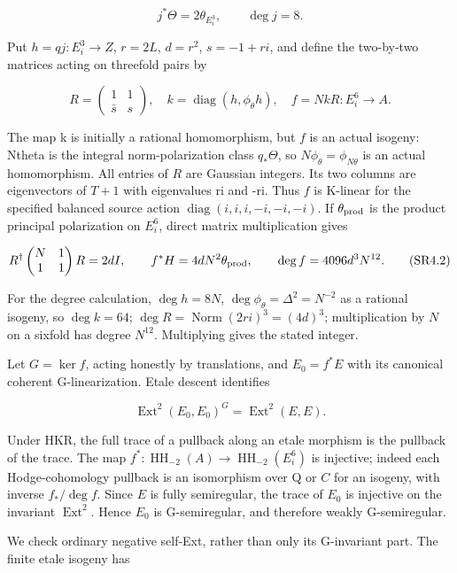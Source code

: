 \[
j^*\Theta=2\theta_{E_i^3},\qquad\deg j=8.
\]

Put \(h=qj:E_i^3\to Z\), \(r=2L\), \(d=r^2\), \(s=-1+ri\), and define the two-by-two matrices acting on threefold pairs by

\[
R=\begin{pmatrix}1&1\\\bar s&s\end{pmatrix},\quad k=\operatorname{diag}(h,\phi_\theta h),\quad f=NkR:E_i^6\longrightarrow A.\tag{SR4.1}
\]

The map k is initially a rational homomorphism, but \(f\) is an actual isogeny: Ntheta is the integral norm-polarization class \(q_*\Theta\), so \(N\phi_\theta=\phi_{N\theta}\) is an actual homomorphism. All entries of \(R\) are Gaussian integers. Its two columns are eigenvectors of \(T+1\) with eigenvalues ri and -ri. Thus \(f\) is K-linear for the specified balanced source action \(\operatorname{diag}(i,i,i,-i,-i,-i)\). If \(\theta_{\rm prod}\) is the product principal polarization on \(E_i^6\), direct matrix multiplication gives

\[
R^\dagger\begin{pmatrix}N&1\\1&1\end{pmatrix}R=2dI,\qquad f^*H=4dN^2\theta_{\rm prod},\qquad\deg f=4096d^3N^{12}.\tag{SR4.2}
\]

For the degree calculation, \(\deg h=8N\), \(\deg\phi_\theta=\Delta^2=N^{-2}\) as a rational isogeny, so \(\deg k=64\); \(\deg R=\operatorname{Norm}(2ri)^3=(4d)^3\); multiplication by \(N\) on a sixfold has degree \(N^{12}\). Multiplying gives the stated integer.

Let \(G=\ker f\), acting honestly by translations, and \(E_0=f^*E\) with its canonical coherent G-linearization. Etale descent identifies

\[
\operatorname{Ext}^2(E_0,E_0)^G=\operatorname{Ext}^2(E,E).
\]

Under HKR, the full trace of a pullback along an etale morphism is the pullback of the trace. The map \(f^*:\operatorname{HH}_{-2}(A)\to\operatorname{HH}_{-2}(E_i^6)\) is injective; indeed each Hodge-cohomology pullback is an isomorphism over Q or \(C\) for an isogeny, with inverse \(f_*/\deg f\). Since \(E\) is fully semiregular, the trace of \(E_0\) is injective on the invariant \(\operatorname{Ext}^2\). Hence \(E_0\) is G-semiregular, and therefore weakly G-semiregular.

We check ordinary negative self-Ext, rather than only its G-invariant part. The finite etale isogeny has

